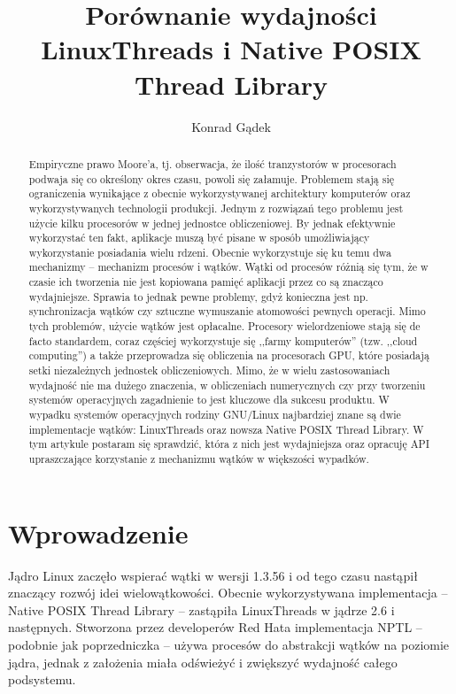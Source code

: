 \documentclass[prodmode]{acmsmall}
\begin{document}

\title{Porównanie wydajności LinuxThreads i Native POSIX Thread Library}
\author{Konrad Gądek
}

\begin{abstract}
Empiryczne prawo Moore'a, tj. obserwacja, że ilość tranzystorów w procesorach podwaja się co określony okres czasu, powoli się załamuje. Problemem stają się ograniczenia wynikające z obecnie wykorzystywanej architektury komputerów oraz wykorzystywanych technologii produkcji. Jednym z rozwiązań tego problemu jest użycie kilku procesorów w jednej jednostce obliczeniowej. By jednak efektywnie wykorzystać ten fakt, aplikacje muszą być pisane w sposób umożliwiający wykorzystanie posiadania wielu rdzeni. Obecnie wykorzystuje się ku temu dwa mechanizmy -- mechanizm procesów i wątków. Wątki od procesów różnią się tym, że w czasie ich tworzenia nie jest kopiowana pamięć aplikacji przez co są znacząco wydajniejsze. Sprawia to jednak pewne problemy, gdyż konieczna jest np. synchronizacja wątków czy sztuczne wymuszanie atomowości pewnych operacji. Mimo tych problemów, użycie wątków jest opłacalne. Procesory wielordzeniowe stają się de facto standardem, coraz częściej wykorzystuje się ,,farmy komputerów'' (tzw. ,,cloud computing'') a także przeprowadza się obliczenia na procesorach GPU, które posiadają setki niezależnych jednostek obliczeniowych. Mimo, że w wielu zastosowaniach wydajność nie ma dużego znaczenia, w obliczeniach numerycznych czy przy tworzeniu systemów operacyjnych zagadnienie to jest kluczowe dla sukcesu produktu. W wypadku systemów operacyjnych rodziny GNU/Linux najbardziej znane są dwie implementacje wątków: LinuxThreads oraz nowsza Native POSIX Thread Library. W tym artykule postaram się sprawdzić, która z nich jest wydajniejsza oraz opracuję API upraszczające korzystanie z mechanizmu wątków w większości wypadków.
\end{abstract}

\maketitle

\section{Wprowadzenie}
Jądro Linux zaczęło wspierać wątki w wersji 1.3.56\cite{mimuw:linux} i od tego czasu nastąpił znaczący rozwój idei wielowątkowości. Obecnie wykorzystywana implementacja -- Native POSIX Thread Library -- zastąpiła LinuxThreads w jądrze 2.6 i następnych. Stworzona przez developerów Red Hata implementacja NPTL -- podobnie jak poprzedniczka -- używa procesów do abstrakcji wątków na poziomie jądra\cite{wiki:ntpl}, jednak z założenia miała odświeżyć i zwiększyć wydajność całego podsystemu\cite{redhat:nptl}.
\end{document}
